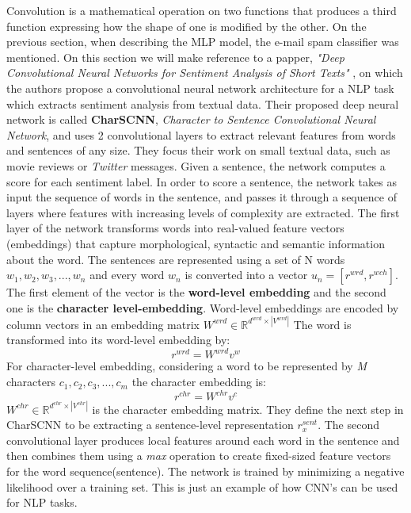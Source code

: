 \documentclass{scrartcl}
\begin{document}
    Convolution  is a mathematical operation on two functions that produces a 
    third function expressing how the shape of one is modified by the other.
    On the previous section, when describing the MLP model, the e-mail spam classifier
    was mentioned. On this section we will make reference to a papper, 
    \textit{"Deep Convolutional Neural Networks for Sentiment Analysis of Short Texts"}
    \cite{dos-santos-gatti-2014-deep}, on which the authors propose a convolutional
    neural network architecture for a NLP task which extracts sentiment analysis from
    textual data.
    Their proposed deep neural network is called \textbf{CharSCNN}, 
    \textit{Character to Sentence Convolutional Neural Network}, and uses 2 convolutional layers
    to extract relevant features from words and sentences of any size. They focus their work 
    on small textual data, such as movie reviews or \textit{Twitter} messages. 
    Given a sentence, the network computes a score for each sentiment label. 
    In order to score a sentence, the network takes as input the sequence of words in the sentence, 
    and passes it through  a sequence of layers where features with increasing levels of 
    complexity are extracted.
    The first layer of the network transforms words into real-valued feature vectors (embeddings) 
    that capture morphological, syntactic and semantic information about the word.
    The sentences are represented using a set of N words ${w_1, w_2, w_3, ..., w_n}$ and every
    word $w_n$ is converted into a vector $u_n = [r^{wrd}, r^{wch}]$. The first element of the 
    vector is the \textbf{word-level embedding} and the second one is the 
    \textbf{character level-embedding}.
    Word-level embeddings are encoded by column vectors in an embedding matrix 
    $W^{wrd} \in \mathbb{R}^{d^{wrd} \times | V^{wrd} | }$
    The word is transformed into its word-level embedding by:
    \begin{equation}
        r^{wrd} = W^{wrd}v^{w}
    \end{equation}
    \newpage
    For character-level embedding, considering a word to be represented by \textit{M} characters
    ${c_1, c_2, c_3, ..., c_m}$ the character embedding is:
    \begin{equation}
        r^{chr} = W^{chr}v^c
    \end{equation}
    $W^{chr} \in \mathbb{R}^{d^{chr} \times | V^{chr} | } $ is the character embedding matrix.
    They define the next step in CharSCNN to be extracting a sentence-level representation
    $r^{sent}_x$.
    The second convolutional layer produces local features around each word in the sentence
    and then combines them using a \textit{max} operation to create fixed-sized feature
    vectors for the word sequence(sentence). The network is trained by minimizing
    a negative likelihood over a training set. \newline
    This is just an example of how CNN's can be used for NLP tasks.
\end{document}
